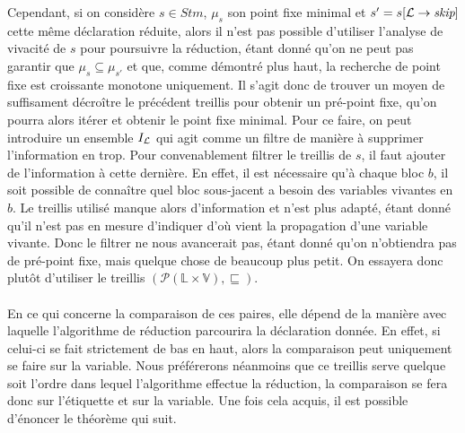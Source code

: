 \documentclass[a4paper, 10pt]{article}
\begin{document}
Cependant, si on considère $s \in Stm$, $\mu_s$ son point fixe minimal et $s' = s[\mathcal{L} \rightarrow{ \textit{skip} }]$ cette même déclaration
réduite, alors il n'est pas possible d'utiliser l'analyse de vivacité de $s$ pour poursuivre la réduction, étant donné qu'on ne peut pas garantir que
$\mu_{s} \subseteq \mu_{s'}$ et que, comme démontré plus haut, la recherche de point fixe est croissante monotone uniquement. 
Il s'agit donc de trouver un moyen de suffisament décroître le précédent treillis pour obtenir un pré-point fixe, qu'on pourra alors itérer et obtenir
le point fixe minimal.
Pour ce faire, on peut introduire un ensemble $I_{\mathcal{L}}$ qui agit comme un filtre de manière à supprimer l'information en trop. 
Pour convenablement filtrer le treillis de $s$, il faut ajouter de l'information à cette dernière. 
En effet, il est nécessaire qu'à chaque bloc $b$, il soit possible de connaître quel bloc sous-jacent
a besoin des variables vivantes en $b$. Le treillis utilisé manque alors d'information et n'est plus adapté, étant donné qu'il n'est pas en mesure
d'indiquer d'où vient la propagation d'une variable vivante. Donc le filtrer ne nous avancerait pas, étant donné qu'on n'obtiendra pas de
pré-point fixe, mais quelque chose de beaucoup plus petit. On essayera donc plutôt d'utiliser le treillis $(\mathcal{P}(\mathbb{L} \times \mathbb{V}), \sqsubseteq)$. 
\\
\\
En ce qui concerne la comparaison de ces paires, elle dépend de la manière avec laquelle l'algorithme de réduction parcourira la déclaration donnée.
En effet, si celui-ci se fait strictement de bas en haut, alors la comparaison peut uniquement se faire sur la variable. Nous préférerons néanmoins
que ce treillis serve quelque soit l'ordre dans lequel l'algorithme effectue la réduction, la comparaison se fera donc sur l'étiquette
et sur la variable. Une fois cela acquis, il est possible d'énoncer le théorème qui suit.
\\
\\
\end{document}
